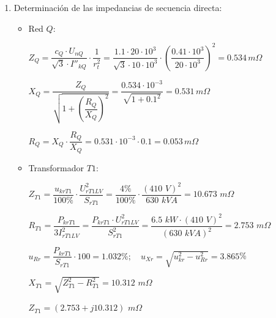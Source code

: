            \begin{enumerate}
                \item Determinación de las impedancias de secuencia directa:
                    \begin{itemize}
                        \item Red $Q$:
                        
                        $Z_\textit{Q} = \dfrac{c_\textit{Q}\cdot U_\textit{nQ}}{\sqrt{3}\cdot I''_\textit{kQ}}\cdot \dfrac{1}{r_\textit{t}^2} = \dfrac{1.1\cdot 20\cdot 10^3}{\sqrt{3}\cdot 10\cdot 10^3}\cdot \left(\dfrac{0.41\cdot 10^3}{20\cdot 10^3}\right)^2 = 0.534\,\textit{m}\varOmega$

                        $X_\textit{Q} = \dfrac{Z_\textit{Q}}{\sqrt{1+\left(\dfrac{R_\textit{Q}}{X_\textit{Q}}\right)^2}} = \dfrac{0.534\cdot 10^{-3}}{\sqrt{1+0.1^2}} = 0.531\,\textit{m}\varOmega$

                        $R_\textit{Q} = X_\textit{Q}\cdot\dfrac{R_\textit{Q}}{X_\textit{Q}} = 0.531\cdot 10^{-3}\cdot 0.1 = 0.053\,\textit{m}\varOmega$

                        \item Transformador $T1$:
                        
                        $Z_\textit{T1} = \dfrac{u_\textit{krT1}}{100\%} \cdot \dfrac{U_\textit{rT1LV}^2}{S_\textit{rT1}} = \dfrac{4\!\text{\%}}{100\!\text{\%}} \cdot \dfrac{(410 \textit{ V})^2}{630 \textit{ kVA}} = 10.673 \textit{ m}\varOmega$\vspace{2mm}

                        $R_\textit{T1} = \dfrac{P_\textit{krT1}}{3 I_\textit{rT1LV}^2} = \dfrac{P_\textit{krT1} \cdot U_\textit{rT1LV}^2}{S_\textit{rT1}^2} = \dfrac{6.5 \textit{ kW} \cdot (410 \textit{ V})^2}{(630 \textit{ kVA})^2} = 2.753 \textit{ m}\varOmega$\vspace{2mm}

                        $u_\textit{Rr} = \dfrac{P_\textit{krT1}}{S_\textit{rT1}} \cdot 100 = 1.032\%; \quad u_\textit{Xr} = \sqrt{u_\textit{kr}^2 - u_\textit{Rr}^2} = 3.865$\%\vspace{2mm}

                        $X_\textit{T1} = \sqrt{Z_\textit{T1}^2 - R_\textit{T1}^2} = 10.312 \textit{ m}\varOmega$\vspace{2mm}

                        $Z_\textit{T1} = (2.753 + j 10.312) \textit{ m}\varOmega$\vspace{2mm}


\end{itemize}
\end{enumerate}

